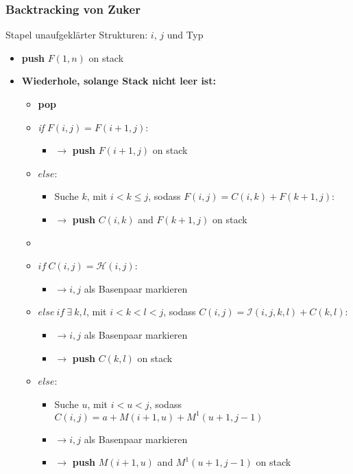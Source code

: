 \subsubsection{Backtracking von Zuker}
Stapel unaufgekl\"arter Strukturen: $i$, $j$ und Typ
\begin{itemize}
	\item[] \textbf{push} $F(1,n)$ on stack
	\item[] \textbf{Wiederhole, solange Stack nicht leer ist:}
	\begin{itemize}
		\item[] \textbf{pop}
		\item[] \textit{if} $F(i,j)=F(i+1, j)$:
			\begin{itemize}
				\item[] $\rightarrow$ \textbf{push} $F(i+1, j)$ on stack
			\end{itemize}
		\item[] $else$:
			\begin{itemize}
				\item[] Suche $k$, mit $i < k \le j$, sodass $F(i,j) = C(i,k) + F(k+1,j)$:
				\item[] $\rightarrow$ \textbf{push} $C(i, k)$ and $F(k+1, j)$ on stack
			\end{itemize}
		\item[]
		\item[] $if~C(i,j) = \mathcal{H}(i,j)$:
			\begin{itemize}
				\item[] $\rightarrow i,j$ als Basenpaar markieren
			\end{itemize}
		\item[] $else~if~\exists~k,l$, mit $i < k < l < j$, sodass $C(i,j) = \mathcal{I}(i,j,k, l) + C(k,l)$:
			\begin{itemize}
				\item[] $\rightarrow i,j$ als Basenpaar markieren
				\item[] $\rightarrow$ \textbf{push} $C(k,l)$ on stack
			\end{itemize}
		\item[] $else$:
			\begin{itemize}
				\item[] Suche $u$, mit $i < u < j$, sodass $C(i,j) = a + M(i+1, u) + M^1(u+1, j-1)$
				\item[] $\rightarrow i,j$ als Basenpaar markieren
				\item[] $\rightarrow$ \textbf{push} $M(i+1, u)$ and $M^1(u+1,j-1)$ on stack
			\end{itemize}

\end{itemize}
\end{itemize}
